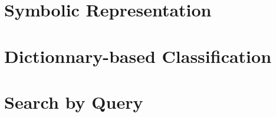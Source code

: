 \section{Symbolic Representation}

\section{Dictionnary-based Classification}

\section{Search by Query}

